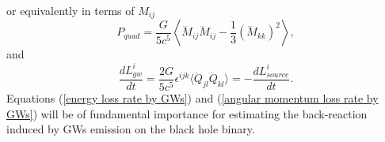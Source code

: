 \documentclass[12pt,twoside,openany]{book}
\begin{document}
or equivalently in terms of $M_{ij}$
\begin{equation}\label{P_quad in terms of M_ij}
     P_{quad}=\frac{G}{5c^5}\left\langle\dddot{M}_{ij}\dddot{M}_{ij}-\frac{1}{3}(\dddot{M}_{kk})^2\right\rangle,
\end{equation}
and 
\begin{equation}\label{angular momentum loss rate by GWs}
    \frac{dL^i_{gw}}{dt}=\frac{2G}{5c^5}\epsilon^{ijk}\langle\ddot{Q}_{jl}\dddot{Q}_{kl}\rangle=-\frac{dL^i_{source}}{dt}.
\end{equation}
Equations (\ref{energy loss rate by GWs}) and (\ref{angular momentum loss rate by GWs}) will be of fundamental importance for estimating the back-reaction induced by GWs emission on the black hole binary.
\end{document}
